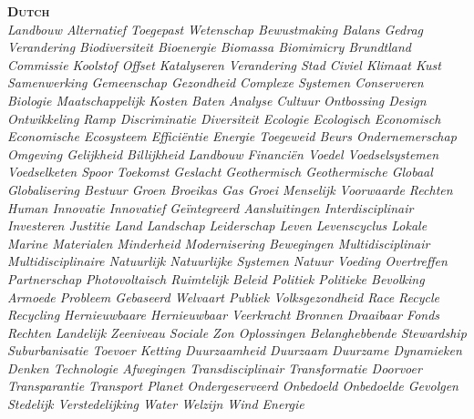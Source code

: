 \documentclass[paper=a4, fontsize=9px]{scrartcl} %
\numberwithin{equation}{section} %
\numberwithin{figure}{section} %
\numberwithin{table}{section} %
\begin{document}
\textsc{\textbf{Dutch}} \\\textit{Landbouw Alternatief Toegepast Wetenschap Bewustmaking Balans Gedrag Verandering Biodiversiteit Bioenergie Biomassa Biomimicry Brundtland Commissie Koolstof Offset Katalyseren Verandering Stad Civiel Klimaat Kust Samenwerking Gemeenschap Gezondheid  Complexe Systemen Conserveren Biologie Maatschappelijk Kosten Baten Analyse Cultuur Ontbossing Design Ontwikkeling Ramp Discriminatie Diversiteit Ecologie Ecologisch Economisch Economische Ecosysteem Efficiëntie Energie Toegeweid Beurs Ondernemerschap Omgeving Gelijkheid Billijkheid Landbouw Financiën Voedel Voedselsystemen Voedselketen Spoor Toekomst Geslacht Geothermisch Geothermische Globaal Globalisering Bestuur Groen Broeikas Gas Groei Menselijk Voorwaarde Rechten Human Innovatie Innovatief Geïntegreerd Aansluitingen Interdisciplinair Investeren Justitie Land Landschap Leiderschap Leven Levenscyclus Lokale Marine Materialen Minderheid Modernisering Bewegingen Multidisciplinair Multidisciplinaire Natuurlijk Natuurlijke Systemen Natuur Voeding Overtreffen Partnerschap Photovoltaisch Ruimtelijk Beleid Politiek Politieke Bevolking Armoede Probleem Gebaseerd Welvaart Publiek Volksgezondheid Race Recycle Recycling Hernieuwbaare Hernieuwbaar Veerkracht Bronnen Draaibaar Fonds Rechten Landelijk Zeeniveau Sociale Zon Oplossingen Belanghebbende Stewardship Suburbanisatie Toevoer Ketting Duurzaamheid Duurzaam Duurzame Dynamieken Denken Technologie Afwegingen Transdisciplinair Transformatie Doorvoer Transparantie Transport Planet Ondergeserveerd Onbedoeld Onbedoelde Gevolgen Stedelijk Verstedelijking Water Welzijn Wind Energie}
\end{document}

